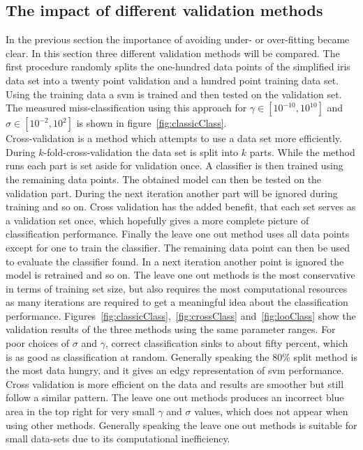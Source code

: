 \subsection{The impact of different validation methods}
In the previous section the importance of avoiding under- or over-fitting became clear. In this section three different validation methods will be compared. The first procedure randomly splits the one-hundred data points of the simplified iris data set into a twenty point validation and a hundred point training data set. Using the training data a svm is trained and then tested on the validation set. The measured miss-classification using this approach for $\gamma \in [10^{-10},10^{10}]$ and $\sigma \in [10^{-2},10^{2}]$ is shown in figure~\ref{fig:classicClass}. \\
Cross-validation is a method which attempts to use a data set more efficiently. During $k$-fold-cross-validation the data set is split into $k$ parts. While the method runs each part is set aside for validation once. A classifier is then trained using the remaining data points. The obtained model can then be tested on the validation part. During the next iteration another part will be ignored during training and so on. Cross validation has the added benefit, that each set serves as a validation set once, which hopefully gives a more complete picture of classification performance. 
Finally the leave one out method uses all data points except for one to train the classifier. The remaining data point can then be used to evaluate the classifier found. In a next iteration another point is ignored the model is retrained and so on. The leave one out methods is the most conservative in terms of training set size, but also requires the most computational resources as many iterations are required to get a meaningful idea about the classification performance. 
Figures~\ref{fig:classicClass},~\ref{fig:crossClass} and~\ref{fig:looClass} show the validation results of the three methods using the same parameter ranges. For poor choices of $\sigma$ and $\gamma$, correct classification sinks to about fifty percent, which is as good as classification at random. Generally speaking the 80\% split method is the most data hungry, and it gives an edgy representation of svm performance. Cross validation is more efficient on the data and results are smoother but still follow a similar pattern. The leave one out methods produces an incorrect blue area in the top right for very small $\gamma$ and $\sigma$ values, which does not appear when using other methods. Generally speaking the leave one out methods is suitable for small data-sets due to its computational inefficiency. 


